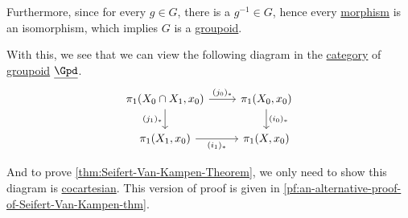 Furthermore, since for every \(g\in G\), there is a \(g^{-1} \in G\), hence every \hyperref[def:morphism]{morphism} is an isomorphism, which implies \(G\) is a \hyperref[def:groupoid]{groupoid}.

With this, we see that we can view the following diagram in the \hyperref[def:category]{category} of \hyperref[def:groupoid]{groupoid} \(\underline{\Gpd}\).
\[
	\begin{tikzcd}
		{\pi_1(X_0\cap X_1, x_0)} & {\pi_1(X_0, x_0)} \\
		{\pi_1(X_1, x_0)} & {\pi_1(X, x_0)}
		\arrow["{(j_0)_\ast}", from=1-1, to=1-2]
		\arrow["{(i_0)_\ast}", from=1-2, to=2-2]
		\arrow["{(i_1)_\ast}"', from=2-1, to=2-2]
		\arrow["{(j_1)_\ast}"', from=1-1, to=2-1]
	\end{tikzcd}
\]

And to prove \autoref{thm:Seifert-Van-Kampen-Theorem}, we only need to show this diagram is \hyperref[def:cocartesian]{cocartesian}.
This version of proof is given in \autoref{pf:an-alternative-proof-of-Seifert-Van-Kampen-thm}.